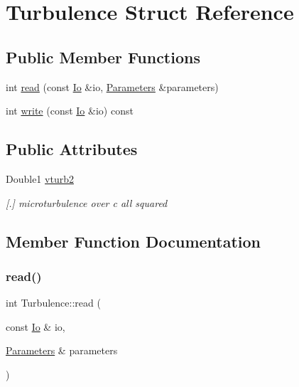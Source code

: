 \hypertarget{structTurbulence}{}\section{Turbulence Struct Reference}
\label{structTurbulence}
\subsection*{Public Member Functions}
\begin{DoxyCompactItemize}
\item 
int \mbox{\hyperlink{structTurbulence_a4cb9c16ae37770b4873d7ab1b14e0b7f}{read}} (const \mbox{\hyperlink{structIo}{Io}} \&io, \mbox{\hyperlink{classParameters}{Parameters}} \&parameters)
\item 
int \mbox{\hyperlink{structTurbulence_a5552d24c437399f5363d2e1ac97c12af}{write}} (const \mbox{\hyperlink{structIo}{Io}} \&io) const
\end{DoxyCompactItemize}
\subsection*{Public Attributes}
\begin{DoxyCompactItemize}
\item 
\mbox{\label{structTurbulence_a75006a6d67857dd02e0f582813838683}} 
Double1 \mbox{\hyperlink{structTurbulence_a75006a6d67857dd02e0f582813838683}{vturb2}}
\begin{DoxyCompactList}\small\item\em \mbox{[}.\mbox{]} microturbulence over c all squared \end{DoxyCompactList}\end{DoxyCompactItemize}


\subsection{Member Function Documentation}
\mbox{\label{structTurbulence_a4cb9c16ae37770b4873d7ab1b14e0b7f}} 
\subsubsection{\texorpdfstring{read()}{read()}}
{\footnotesize\ttfamily int Turbulence\+::read (\begin{DoxyParamCaption}\item[{const \mbox{\hyperlink{structIo}{Io}} \&}]{io,  }\item[{\mbox{\hyperlink{classParameters}{Parameters}} \&}]{parameters }\end{DoxyParamCaption})}

